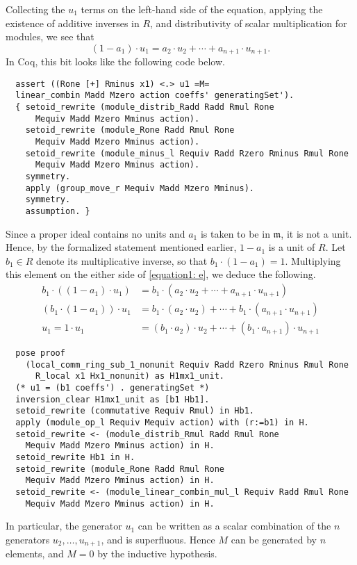 \documentclass{article}
\begin{document}
Collecting the \(u_{1}\) terms on the left-hand side of the equation, applying
the existence of additive inverses in $R$, and distributivity of scalar
multiplication for modules, we see that
\begin{equation}\label{equation1: e}
(1 - a_{1}) \cdot u_{1} =
  a_{2} \cdot u_{2} + \cdots + a_{n+1} \cdot u_{n+1}\text{.}
\end{equation}
In Coq, this bit looks like the following code below.
\begin{verbatim}
  assert ((Rone [+] Rminus x1) <.> u1 =M=
  linear_combin Madd Mzero action coeffs' generatingSet').
  { setoid_rewrite (module_distrib_Radd Radd Rmul Rone
      Mequiv Madd Mzero Mminus action).
    setoid_rewrite (module_Rone Radd Rmul Rone
      Mequiv Madd Mzero Mminus action).
    setoid_rewrite (module_minus_l Requiv Radd Rzero Rminus Rmul Rone
      Mequiv Madd Mzero Mminus action).
    symmetry.
    apply (group_move_r Mequiv Madd Mzero Mminus).
    symmetry.
    assumption. }
\end{verbatim}

Since a proper ideal contains no units and $a_1$ is taken to be in
$\mathfrak{m}$, it is not a unit. Hence, by the formalized statement mentioned
earlier, $1 - a_{1}$ is a unit of $R$. Let $b_{1} \in R$ denote its 
multiplicative inverse, so that $b_1 \cdot  (1 - a_{1}) = 1$. Multiplying this
element on the either side of \eqref{equation1: e}, we deduce the following.  
\begin{align*}
b_1 \cdot \left((1 - a_{1}) \cdot u_{1} \right)
  & = b_1 \cdot (a_{2} \cdot u_{2} + \cdots + a_{n+1} \cdot u_{n+1}) \\
\left( b_1 \cdot (1 - a_{1})\right) \cdot u_{1}
  & = b_1 \cdot (a_{2} \cdot u_{2}) + \cdots + b_1 \cdot (a_{n+1} \cdot u_{n+1}) \\
u_1 = 1 \cdot u_{1}
  & = (b_1 \cdot  a_{2}) \cdot u_{2} + \cdots + (b_1  \cdot  a_{n+1}) \cdot u_{n+1}  
\end{align*}
\begin{verbatim}
  pose proof
    (local_comm_ring_sub_1_nonunit Requiv Radd Rzero Rminus Rmul Rone
      R_local x1 Hx1_nonunit) as H1mx1_unit.
  (* u1 = (b1 coeffs') . generatingSet *)
  inversion_clear H1mx1_unit as [b1 Hb1].
  setoid_rewrite (commutative Requiv Rmul) in Hb1.
  apply (module_op_l Requiv Mequiv action) with (r:=b1) in H.
  setoid_rewrite <- (module_distrib_Rmul Radd Rmul Rone
    Mequiv Madd Mzero Mminus action) in H.
  setoid_rewrite Hb1 in H.
  setoid_rewrite (module_Rone Radd Rmul Rone
    Mequiv Madd Mzero Mminus action) in H.
  setoid_rewrite <- (module_linear_combin_mul_l Requiv Radd Rmul Rone
    Mequiv Madd Mzero Mminus action) in H.
\end{verbatim}
In particular, the generator $u_1$ can be written as a scalar combination of
the $n$ generators $u_2, \ldots, u_{n+1}$, and is superfluous. Hence $M$ can be
generated by $n$ elements, and $M=0$ by the inductive hypothesis. 
\end{document}
